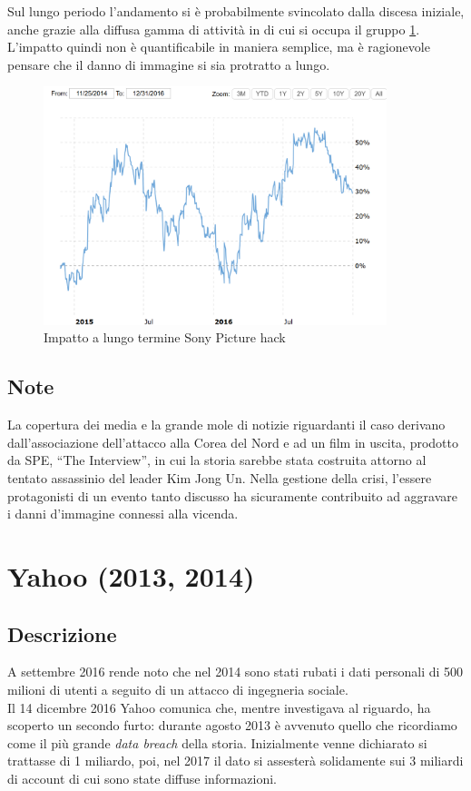 \documentclass[12pt,a4paper,openright,twoside]{report}
\begin{document}
Sul lungo periodo l'andamento si \`e probabilmente svincolato dalla discesa iniziale, anche  grazie alla diffusa gamma di attivit\`a in di cui si occupa il gruppo \ref{fig:sPic2}. L'impatto quindi non \`e quantificabile in maniera semplice, ma \`e ragionevole pensare che il danno di immagine si sia protratto a lungo.\\
\begin{figure}[H] 
\begin{center} 
\includegraphics[width=10cm]{figures/sony_2014_long.png} 
\caption[Grafico Sony Pic long]{Impatto a lungo termine Sony Picture hack}\label{fig:sPic2}
\end{center}
\end{figure}
\subsection{Note}
La copertura dei media e la grande mole di notizie riguardanti il caso derivano dall'associazione dell'attacco alla Corea del Nord e ad un film in uscita, prodotto da SPE, ``The Interview'', in cui la storia sarebbe stata costruita attorno al tentato assassinio del leader Kim Jong Un.
Nella gestione della crisi, l'essere protagonisti di un evento tanto discusso ha sicuramente contribuito ad aggravare i danni d'immagine connessi alla vicenda\cite{SonyPic_buzzfeed}.\\

\section{Yahoo (2013, 2014)}
\subsection{Descrizione}
A settembre 2016 rende noto che nel 2014 sono stati rubati i dati personali di 500 milioni di utenti a seguito di un attacco di ingegneria sociale\cite{yahoo_book}.\\
Il 14 dicembre 2016 Yahoo comunica che, mentre investigava al riguardo, ha scoperto un secondo furto: durante agosto 2013 \`e avvenuto quello che ricordiamo come il pi\`u grande \textit{data breach} della storia. Inizialmente venne dichiarato si trattasse di 1 miliardo, poi, nel 2017 il dato si assester\`a solidamente sui 3 miliardi di account di cui sono state diffuse informazioni\cite{yahoo_book}\cite{yahoo_guardian}.
\end{document}
